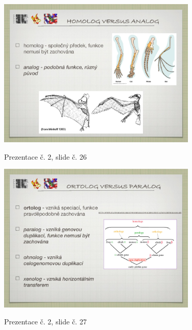 \documentclass[DIV=8]{scrreprt}
\begin{document}
\begin{figure}
    \caption{Prezentace č. 2, slide č. 26}
    \includegraphics[width=0.85\textwidth]{slides-2/slide-26.jpg}
    \centering
    \label{slides-2-slide-26}
\end{figure}
\begin{figure}
    \caption{Prezentace č. 2, slide č. 27}
    \includegraphics[width=0.85\textwidth]{slides-2/slide-27.jpg}
    \centering
    \label{slides-2-slide-27}
\end{figure}
\end{document}
